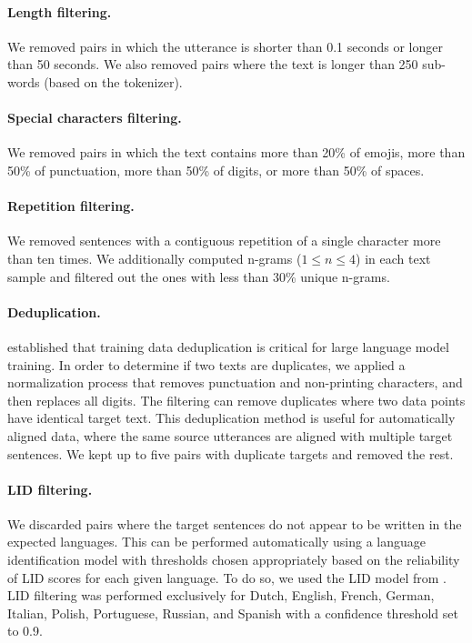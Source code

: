\paragraph{Length filtering.}
We removed pairs in which the utterance is shorter than 0.1 seconds or longer than 50 seconds. We also removed pairs where the text is longer than 250 sub-words (based on the \mfourt tokenizer).

\paragraph{Special characters filtering.}
We removed pairs in which the text contains 
more than 20\% of emojis, 
more than 50\% of punctuation, 
more than 50\% of digits, 
or more than 50\% of spaces.

\paragraph{Repetition filtering.}
We removed sentences with a contiguous repetition of a single character more than ten times. %
We additionally computed n-grams ($1\leq n\leq 4$) in each text sample and filtered out the ones with less than 30\% unique n-grams. 

\paragraph{Deduplication.} \citet{lee_dedup} established that training data deduplication is critical for large language model training. In order to determine if two texts are duplicates, we applied a normalization process that removes punctuation and non-printing characters, and then replaces all digits.
The filtering can remove duplicates where two data points have identical target text.
This deduplication method is useful for automatically aligned data, where the same source utterances are aligned with multiple target sentences.
We kept up to five pairs with duplicate targets and removed the rest.

\paragraph{LID filtering.} We discarded pairs where the target sentences do not appear to be written in the expected languages. This can be performed automatically using a language identification model with thresholds chosen appropriately based on the reliability of LID scores for each given language.
To do so, we used the LID model from \citet{nllb2022}.
LID filtering was performed exclusively for Dutch, English, French, German, Italian, Polish, Portuguese, Russian, and Spanish with a confidence threshold set to 0.9.


